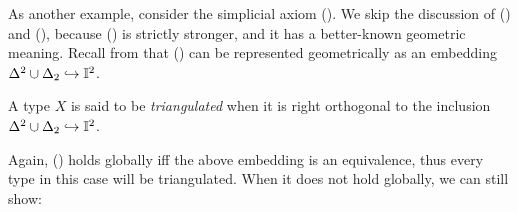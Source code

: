 As another example, consider the simplicial axiom (\AxiomSL). We skip the discussion of (\AxiomL) and (\AxiomCL), because (\AxiomSL) is strictly stronger, and it has a better-known geometric meaning. Recall from  that (\AxiomSL) can be represented geometrically as an embedding $\Delta^2\cup\Delta_2 \hookrightarrow \mathbb{I}^2$.

\begin{definition}
  A type $X$ is said to be \emph{triangulated} when it is right orthogonal to the inclusion $\Delta^2 \cup \Delta_2 \hookrightarrow \mathbb{I}^2$.
\end{definition}

Again, (\AxiomSL) holds globally iff the above embedding is an equivalence, thus every type in this case will be triangulated. When it does not hold globally, we can still show:

